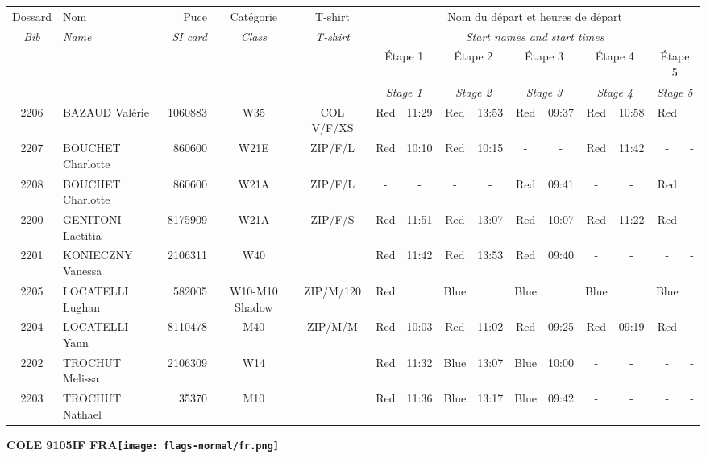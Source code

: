 \documentclass{report}
\begin{document}
  \begin{longtable}{|c|l|r|c|c|*{5}{cc|}}
    Dossard & Nom  & Puce    & Catégorie & T-shirt & \multicolumn{10}{c|}{Nom du départ et heures de départ} \\
    \itshape Bib     & \itshape Name & \itshape SI card & \itshape Class  & \itshape  T-shirt  & \multicolumn{10}{c|}{\itshape Start names and start times} \\
    \hline
    & & & & & \multicolumn{2}{c|}{Étape 1} & \multicolumn{2}{c|}{Étape 2} & \multicolumn{2}{c|}{Étape 3} & \multicolumn{2}{c|}{Étape 4} & \multicolumn{2}{c|}{Étape 5} \\
    & & & & & \multicolumn{2}{c|}{\itshape Stage 1} & \multicolumn{2}{c|}{\itshape Stage 2} & \multicolumn{2}{c|}{\itshape Stage 3} & \multicolumn{2}{c|}{\itshape Stage 4} & \multicolumn{2}{c|}{\itshape Stage 5} \\
    \hline
    2206 & BAZAUD Valérie & 1060883 & W35 & COL V/F/XS & Red & 11:29 & Red & 13:53 & Red & 09:37 & Red & 10:58 & Red &  \\
    2207 & BOUCHET Charlotte & 860600 & W21E & ZIP/F/L & Red & 10:10 & Red & 10:15 & - &  - & Red & 11:42 & - &  -\\
    2208 & BOUCHET Charlotte & 860600 & W21A & ZIP/F/L & - &  - & - &  - & Red & 09:41 & - &  - & Red &  \\
    2200 & GENITONI Laetitia & 8175909 & W21A & ZIP/F/S & Red & 11:51 & Red & 13:07 & Red & 10:07 & Red & 11:22 & Red &  \\
    2201 & KONIECZNY Vanessa & 2106311 & W40 &   & Red & 11:42 & Red & 13:53 & Red & 09:40 & - &  - & - &  -\\
    2205 & LOCATELLI Lughan & 582005 & W10-M10 Shadow & ZIP/M/120 & Red &   & Blue &   & Blue &   & Blue &   & Blue &  \\
    2204 & LOCATELLI Yann & 8110478 & M40 & ZIP/M/M & Red & 10:03 & Red & 11:02 & Red & 09:25 & Red & 09:19 & Red &  \\
    2202 & TROCHUT Melissa & 2106309 & W14 &   & Red & 11:32 & Blue & 13:07 & Blue & 10:00 & - &  - & - &  -\\
    2203 & TROCHUT Nathael & 35370 & M10 &   & Red & 11:36 & Blue & 13:17 & Blue & 09:42 & - &  - & - &  -\\
  \end{longtable}
\newpage
  \Huge \centering \bfseries COLE 9105IF FRA\normalfont \footnotesize \sffamily \hfill \texttt{[image: flags-normal/fr.png]} \newline 
\end{document}
